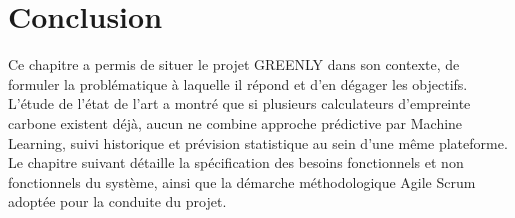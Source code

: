 \section*{Conclusion}
Ce chapitre a permis de situer le projet GREENLY dans son contexte, de formuler la problématique à laquelle il répond et d'en dégager les objectifs. L'étude de l'état de l'art a montré que si plusieurs calculateurs d'empreinte carbone existent déjà, aucun ne combine approche prédictive par Machine Learning, suivi historique et prévision statistique au sein d'une même plateforme. Le chapitre suivant détaille la spécification des besoins fonctionnels et non fonctionnels du système, ainsi que la démarche méthodologique Agile Scrum adoptée pour la conduite du projet.
